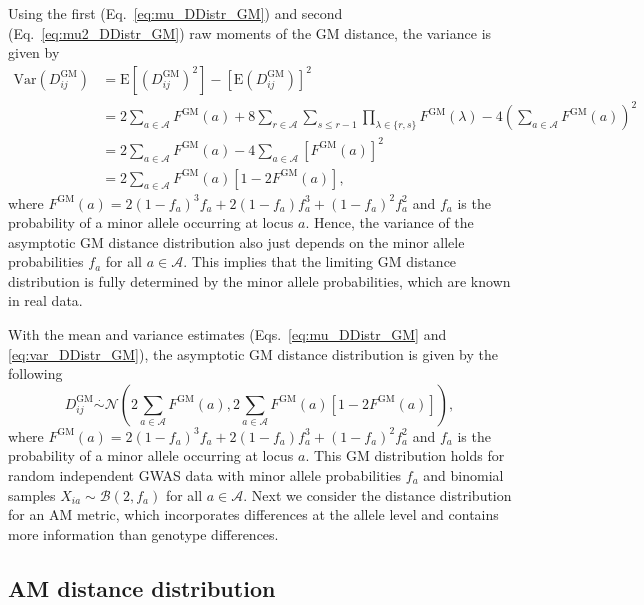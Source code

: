 \documentclass[10pt,letterpaper]{article}
\begin{document}
Using the first (Eq.~\ref{eq:mu_DDistr_GM}) and second (Eq.~\ref{eq:mu2_DDistr_GM}) raw moments of the GM distance, the variance is given by
%
\begin{equation}\label{eq:var_DDistr_GM}
\begin{aligned}
\text{Var}\left(D^\text{GM}_{ij}\right) &= \text{E}\left[\left(D^\text{GM}_{ij}\right)^2\right] - \left[\text{E}\left(D^\text{GM}_{ij}\right)\right]^2 \\
&= 2\sum_{a \in \mathcal{A}} F^\text{GM}(a) + 8\sum_{r \in \mathcal{A}} \sum_{s \leq r - 1} \prod_{\lambda \in \{r,s\}} F^\text{GM}(\lambda) - 4\left(\sum_{a \in \mathcal{A}}F^\text{GM}(a)\right)^2 \\
&= 2\sum_{a \in \mathcal{A}} F^\text{GM}(a) - 4\sum_{a \in \mathcal{A}}\left[F^\text{GM}(a)\right]^2 \\
&= 2\sum_{a \in \mathcal{A}} F^\text{GM}(a)[1 - 2F^\text{GM}(a)],
\end{aligned}
\end{equation}
%
where $F^\text{GM}(a) = 2(1 - f_a)^3f_a + 2(1 - f_a)f^3_a + (1 - f_a)^2f^2_a$ and $f_a$ is the probability of a minor allele occurring at locus $a$. Hence, the variance of the asymptotic GM distance distribution also just depends on the minor allele probabilities $f_a$ for all $a \in \mathcal{A}$. This implies that the limiting GM distance distribution is fully determined by the minor allele probabilities, which are known in real data.

With the mean and variance estimates (Eqs.~\ref{eq:mu_DDistr_GM} and \ref{eq:var_DDistr_GM}), the asymptotic GM distance distribution is given by the following
%
\begin{equation}\label{eq:DDistr_GM}
D^\text{GM}_{ij} \overset{.}{\sim} \mathcal{N}\left(2\sum_{a \in \mathcal{A}} F^\text{GM}(a), 2\sum_{a \in \mathcal{A}} F^\text{GM}(a)[1 - 2F^\text{GM}(a)]\right),
\end{equation}
%
where $F^\text{GM}(a) = 2(1 - f_a)^3f_a + 2(1 - f_a)f^3_a + (1 - f_a)^2f^2_a$ and $f_a$ is the probability of a minor allele occurring at locus $a$. This GM distribution holds for random independent GWAS data with minor allele probabilities $f_a$ and binomial samples $X_{ia} \sim \mathcal{B}(2,f_a)$ for all $a \in \mathcal{A}$. Next we consider the distance distribution for an AM metric, which incorporates differences at the allele level and contains more information than genotype differences.

\subsection*{AM distance distribution}
\end{document}
